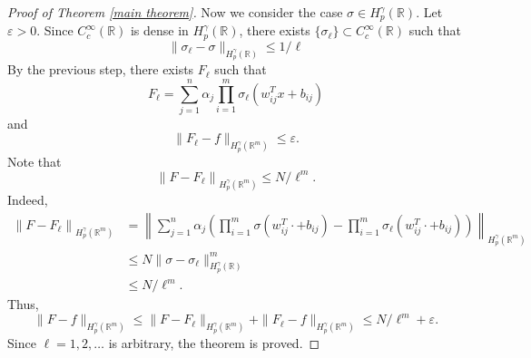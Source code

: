 \documentclass[11pt,reqno]{amsart}
\numberwithin{equation}{section}
\theoremstyle{remark}
\theoremstyle{definition}
\newcommand\bR{\mathbb{R}}
\newcommand\ep{\varepsilon}
\begin{document}
\begin{proof}[Proof of Theorem \ref{main theorem}]
Now we consider the case $\sigma\in H_{p}^{\gamma}(\bR)$. Let $\ep>0$. Since $C_{c}^{\infty}(\bR)$ is dense in $H_{p}^{\gamma}(\bR)$, there exists $\{\sigma_{\ell}\}\subset C_{c}^{\infty}(\bR)$ such that 
\begin{equation}
\label{sigma approximation}
\|\sigma_{\ell} - \sigma\|_{H_{p}^{\gamma}(\bR)}\leq 1/\ell
\end{equation}
By the previous step, there exists $F_{\ell}$ such that
\begin{equation*}
F_{\ell} = \sum_{j = 1}^{n}\alpha_{j} \prod_{i = 1}^{m}\sigma_{\ell}\left( w^{T}_{ij} x + b_{ij} \right)
\end{equation*}
and 
\begin{equation*}
\| F_{\ell} - f \|_{H_{p}^{\gamma}(\bR^{m})} \leq \ep.
\end{equation*}
Note that
\begin{equation*}
\left\|F - F_{\ell} \right\|_{H_{p}^{\gamma}(\bR^{m})} \leq N/\ell^m.
\end{equation*}
Indeed,
\begin{equation*}
\begin{aligned}
\left\|F - F_{\ell} \right\|_{H_{p}^{\gamma}(\bR^{m})}
&=\left\| \sum_{j = 1}^{n}\alpha_{j} \left(\prod_{i = 1}^{m}\sigma\left( w^{T}_{ij} \cdot + b_{ij} \right) - \prod_{i = 1}^{m}\sigma_{\ell}\left( w^{T}_{ij} \cdot + b_{ij} \right) \right)\right\|_{H_{p}^{\gamma}(\bR^{m})} \\
&\leq N\| \sigma - \sigma_{\ell} \|_{H_{p}^{\gamma}(\bR)}^{m} \\
&\leq N/\ell^m.
\end{aligned}
\end{equation*}
Thus,
\begin{equation*}
\| F - f \|_{H_{p}^{\gamma}(\bR^{m})} 
\leq \|F - F_{\ell}\|_{H_{p}^{\gamma}(\bR^{m})}
+ \|F_{\ell} - f\|_{H_{p}^{\gamma}(\bR^{m})} \leq N/\ell^m+\ep.
\end{equation*}
Since $\ell=1,2,\dots$ is arbitrary, the theorem is proved.
\end{proof}
\end{document}
